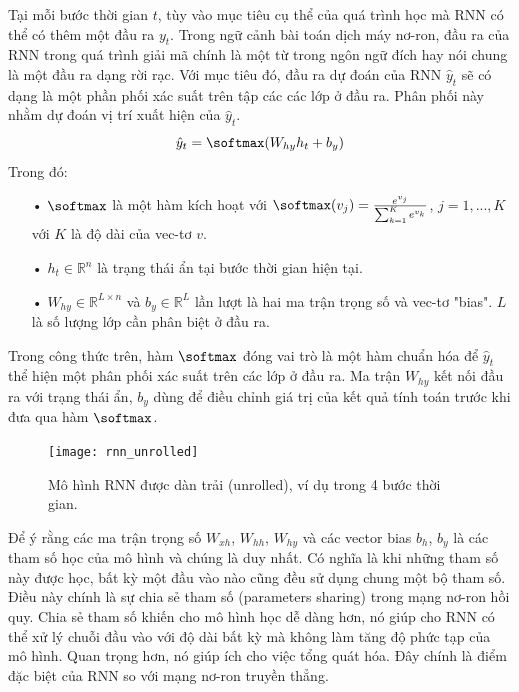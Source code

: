 Tại mỗi bước thời gian $t$, tùy vào mục tiêu cụ thể của quá trình học mà RNN có thể có thêm một đầu ra $y_t$. Trong ngữ cảnh bài toán dịch máy nơ-ron, đầu ra của RNN trong quá trình giải mã chính là một từ trong ngôn ngữ đích hay nói chung là một đầu ra dạng rời rạc. Với mục tiêu đó, đầu ra dự đoán của RNN $\hat{y}_t$ sẽ có dạng là một phần phối xác suất trên tập các các lớp ở đầu ra. Phân phối này nhằm dự đoán vị trí xuất hiện của $\hat{y}_t$.
\begin{equation} \label{rnnOuputSoftmaxDistribution}
	\hat{y}_t = \softmax(W_{hy}h_t + b_y)
\end{equation}
Trong đó:
\begin{itemize}
	\item[•] $\softmax$ là một hàm kích hoạt với $\softmax(v_j) = \frac{e^{v_j}}{\sum_{k=1}^{K}e^{v_k}}$, $j = 1,...,K$ với $K$ là độ dài của vec-tơ $v$.
	\item[•] $h_{t} \in \mathbb{R}^n$ là trạng thái ẩn tại bước thời gian hiện tại.
	\item[•] $W_{hy} \in \mathbb{R}^{L \times n}$ và $b_y \in \mathbb{R}^L$ lần lượt là hai ma trận trọng số và vec-tơ "bias". $L$ là số lượng lớp cần phân biệt ở đầu ra.
\end{itemize}

Trong công thức trên, hàm $\softmax$ đóng vai trò là một hàm chuẩn hóa để $\hat{y}_t$ thể hiện một phân phối xác suất trên các lớp ở đầu ra. Ma trận $W_{hy}$ kết nối đầu ra với trạng thái ẩn, $b_y$ dùng để điều chỉnh giá trị của kết quả tính toán trước khi đưa qua hàm $\softmax$.

\begin{figure}
	\centering
	\texttt{[image: rnn\_unrolled]}
	\caption[Mô hình RNN dạng dàn trải]{Mô hình RNN được dàn trải (unrolled), ví dụ trong 4 bước thời gian.}
	\label{fig_rnn_unrolled}
\end{figure}

Để ý rằng các ma trận trọng số $W_{xh}$, $W_{hh}$, $W_{hy}$ và các vector bias $b_h$, $b_y$ là các tham số học của mô hình và chúng là duy nhất. Có nghĩa là khi những tham số này được học, bất kỳ một đầu vào nào cũng đều sử dụng chung một bộ tham số. Điều này chính là sự chia sẻ tham số (parameters sharing) trong mạng nơ-ron hồi quy. Chia sẻ tham số khiến cho mô hình học dễ dàng hơn, nó giúp cho RNN có thể xử lý chuỗi đầu vào với độ dài bất kỳ mà không làm tăng độ phức tạp của mô hình. Quan trọng hơn, nó giúp ích cho việc tổng quát hóa. Đây chính là điểm đặc biệt của RNN so với mạng nơ-ron truyền thẳng.

